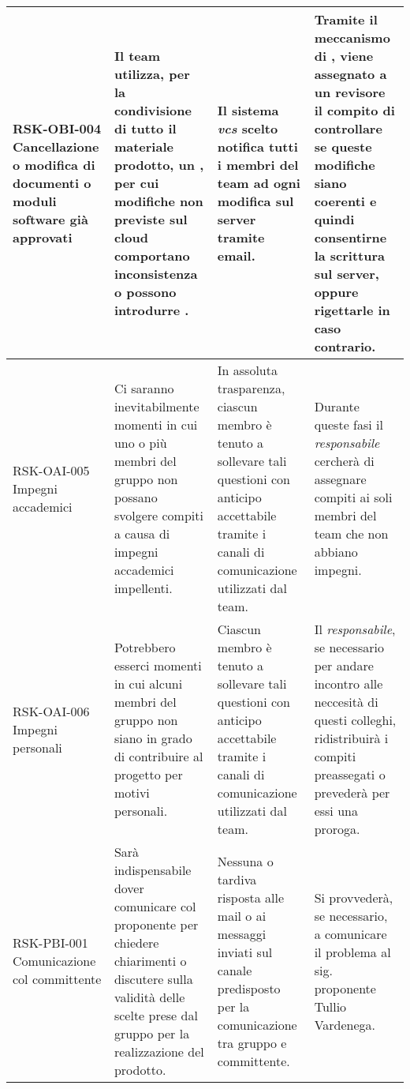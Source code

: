 \begin{center}
\begin{longtable}{|p{3cm}|p{4cm}|p{3.5cm}|p{3.5cm}|}
		\hline
	RSK-OBI-004 \newline Cancellazione o modifica di documenti o moduli software già approvati & 
	Il team utilizza, per la condivisione di tutto il materiale prodotto, un \glock{vcs}, per cui modifiche non previste sul cloud comportano inconsistenza o possono introdurre \glock{regressioni}.
	&  Il sistema \textit{vcs} scelto notifica tutti i membri del team ad ogni modifica sul server tramite email.   
	 
	& Tramite il meccanismo di \glock{Pull Request}, viene assegnato a un revisore il compito di controllare se queste modifiche siano coerenti e quindi consentirne la scrittura sul server, oppure rigettarle in caso contrario.   \\
	\hline
	
		\hline
	RSK-OAI-005 \newline Impegni accademici & 
	Ci saranno inevitabilmente momenti in cui uno o più membri del gruppo non possano svolgere compiti a causa di impegni accademici impellenti.
	&  In assoluta trasparenza, ciascun membro è tenuto a sollevare tali questioni con anticipo accettabile tramite i canali di comunicazione utilizzati dal team.
	 
	& Durante queste fasi il \textit{responsabile} cercherà di assegnare compiti ai soli membri del team che non abbiano impegni. \\
	\hline
	
		\hline
	RSK-OAI-006 \newline Impegni personali & 
	Potrebbero esserci momenti in cui alcuni membri del gruppo non siano in grado di contribuire al progetto per motivi personali.
	&  Ciascun membro è tenuto a sollevare tali questioni con anticipo accettabile tramite i canali di comunicazione utilizzati dal team.
	 
	& Il \textit{responsabile}, se necessario per andare incontro alle neccesità di questi colleghi, ridistribuirà i compiti preassegati o prevederà per essi una proroga. \\
	\hline
	
		\hline
	RSK-PBI-001 \newline Comunicazione col committente
	 & 
	Sarà indispensabile dover comunicare col proponente per chiedere chiarimenti o discutere sulla validità delle scelte prese dal gruppo per la realizzazione del prodotto.
	&  Nessuna o tardiva risposta alle mail o ai messaggi inviati sul canale \glock{slack} predisposto per la comunicazione tra gruppo e committente.
	 
	& Si provvederà, se necessario, a comunicare il problema al sig. proponente Tullio Vardenega.  \\
	\hline
	

\end{longtable}
\end{center}
